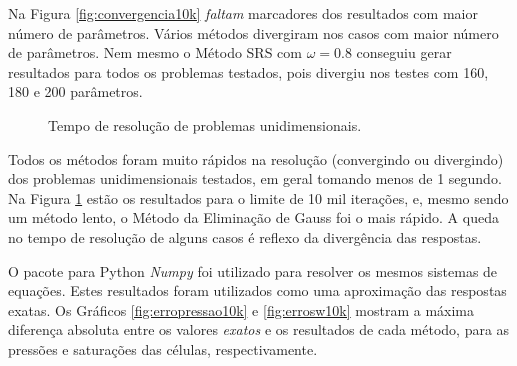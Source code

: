 \documentclass[final,5p]{elsarticle}
\numberwithin{equation}{section}
\begin{document}
        Na Figura \ref{fig:convergencia10k} \emph{faltam} marcadores dos resultados com maior número de parâmetros. Vários métodos divergiram nos casos com maior número de parâmetros. Nem mesmo o Método SRS com $\omega = 0.8$ conseguiu gerar resultados para todos os problemas testados, pois divergiu nos testes com 160, 180 e 200 parâmetros.

        \begin{figure}[hbt!]
            \caption{Tempo de resolução de problemas unidimensionais.}
            \label{fig:dt10k}
        \end{figure}

        Todos os métodos foram muito rápidos na resolução (convergindo ou divergindo) dos problemas unidimensionais testados, em geral tomando menos de 1 segundo. Na Figura \ref{fig:dt10k} estão os resultados para o limite de 10 mil iterações, e, mesmo sendo um método lento, o Método da Eliminação de Gauss foi o mais rápido. A queda no tempo de resolução de alguns casos é reflexo da divergência das respostas.

        O pacote para Python \emph{Numpy} foi utilizado para resolver os mesmos sistemas de equações\cite{dongarra1992lapack}. Estes resultados foram utilizados como uma aproximação das respostas exatas. Os Gráficos \ref{fig:erropressao10k} e \ref{fig:errosw10k} mostram a máxima diferença absoluta entre os valores \emph{exatos} e os resultados de cada método, para as pressões e saturações das células, respectivamente.
\end{document}

